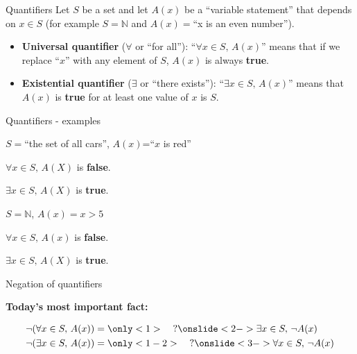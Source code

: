 \documentclass[11pt]{beamer}
\theoremstyle{definition}
\begin{document}
\begin{frame}{Quantifiers}
  Let $S$ be a set and let $A(x)$ be a ``variable statement'' that depends on
  $x\in S$ (for example $S=\mathbb{N}$ and $A(x)=$``x is an even number'').
  \pause

  \begin{itemize}
    \item \textbf{Universal quantifier} ($\forall$ or ``for all''):
          ``$\forall x\in S,\,A(x)$'' means that if we replace ``$x$'' with any
          element of $S$, $A(x)$ is always \textbf{true}.
    \item \textbf{Existential quantifier} ($\exists$ or ``there exists''):
          ``$\exists x\in S,\, A(x)$'' means that $A(x)$ is \textbf{true} for
          at least one value of $x$ is $S$.
  \end{itemize}
\end{frame}

\begin{frame}{Quantifiers - examples}
  \begin{example}
  $S=$``the set of all cars'', $A(x)$=``$x$ is red''

  $\forall x\in S,\, A(X)$ is \textbf{false}.

  $\exists x\in S,\, A(X)$ is \textbf{true}.
  \end{example}
  \begin{example}
    $S=\mathbb{N}$, $A(x)=x>5$

  $\forall x\in S,\, A(x)$ is \textbf{false}.

  $\exists x\in S,\, A(X)$ is \textbf{true}.
  \end{example}
\end{frame}

\begin{frame}{Negation of quantifiers}
  \begin{center}
    \textbf{Today's most important fact:}
  \end{center}
  \begin{align*}
    \neg(\forall x\in S,\, A(x))&=\only<1>{\quad?}
    \onslide<2->{\exists x\in S,\,\neg A(x)}\\
    \neg(\exists x\in S,\, A(x))&=\only<1-2>{\quad?}
    \onslide<3->{\forall x\in S,\,\neg A(x)}\\
  \end{align*}
\end{frame}
\end{document}
